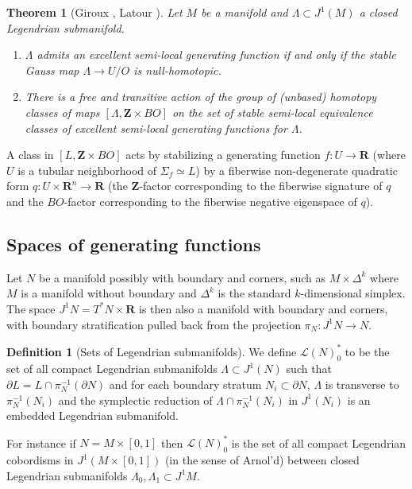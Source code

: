 \documentclass[12pt,a4paper]{article}
\numberwithin{equation}{section}
\newtheorem{thm}[equation]{Theorem}
\theoremstyle{definition}
\newtheorem{dfn}[equation]{Definition}
\theoremstyle{remark}
\newcommand{\Z}{\mathbf{Z}}
\newcommand{\R}{\mathbf{R}}
\newcommand{\LL}{\mathcal{L}}
\newcommand{\del}{\partial}
\begin{document}
\begin{thm}[Giroux \cite{Giroux}, Latour \cite{Latour}] \label{thm:girouxlatour}
Let $M$ be a manifold and $\Lambda\subset J^1(M)$ a closed Legendrian submanifold.
\begin{enumerate}
\item
$\Lambda$ admits an excellent semi-local generating function if and only if the stable Gauss map
$\Lambda\to U/O$ is null-homotopic.
\item There is a free and transitive action of the group of (unbased) homotopy classes
of maps $[\Lambda,\Z\times BO]$ on the set of stable semi-local equivalence classes of excellent semi-local generating
functions for $\Lambda$.
\end{enumerate}
\end{thm}

A class in $[L,\Z\times BO]$ acts by stabilizing a generating function $f:U\to \R$
(where $U$ is a tubular neighborhood of $\Sigma_f\simeq L$) by a fiberwise non-degenerate quadratic form $q:U\times \R^n\to \R$
(the $\Z$-factor corresponding to the fiberwise signature of $q$ and the $BO$-factor corresponding to the fiberwise negative eigenspace of $q$).

\subsection{Spaces of generating functions}

Let $N$ be a manifold possibly with boundary and corners, such as $M\times\Delta^k$ where $M$ is a manifold without boundary
and $\Delta^k$ is the standard $k$-dimensional simplex. The space $J^1 N=T^* N \times \R$ is then also a manifold
with boundary and corners, with boundary stratification pulled back from the projection $\pi_N:J^1 N\to N$.

\begin{dfn}[Sets of Legendrian submanifolds]\label{dfn:setLeg}
We define $\LL(N)^*_0$ to be the set of all compact Legendrian submanifolds $\Lambda\subset J^1(N)$
such that $\del L=L\cap \pi_N^{-1}(\del N)$ and for each boundary stratum $N_i\subset \del N$,
$\Lambda$ is transverse to $\pi_N^{-1}(N_i)$ and the symplectic reduction of $\Lambda\cap \pi_N^{-1}(N_i)$
in $J^1 (N_i)$ is an embedded Legendrian submanifold.
\end{dfn}

For instance if $N=M\times [0,1]$ then $\LL(N)^*_0$ is the set of all compact Legendrian
cobordisms in $J^1(M\times[0,1])$ (in the sense of Arnol'd) between closed Legendrian submanifolds $\Lambda_0, \Lambda_1 \subset J^1 M$.
\end{document}
